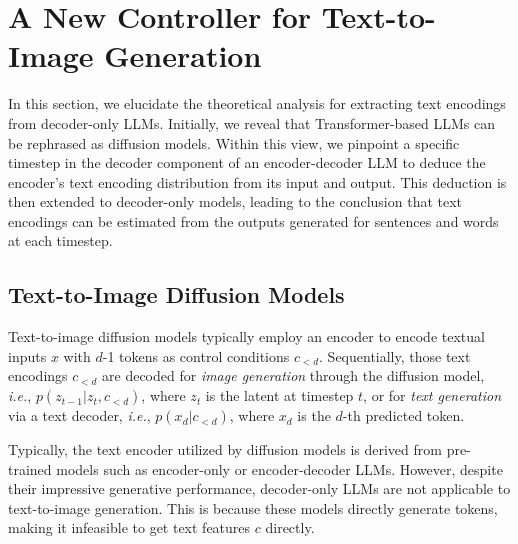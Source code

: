 \section{A New Controller for Text-to-Image Generation}
\label{sec:llm_diffusion}

In this section, we elucidate the theoretical analysis for extracting text encodings from decoder-only LLMs. Initially, we reveal that Transformer-based LLMs can be rephrased as diffusion models.
Within this view, we pinpoint a specific timestep in the decoder component of an encoder-decoder LLM to deduce the encoder's text encoding distribution from its input and output. This deduction is then extended to decoder-only models, leading to the conclusion that text encodings can be estimated from the outputs generated for sentences and words at each timestep.


\subsection{Text-to-Image Diffusion Models}
Text-to-image diffusion models typically employ an encoder to encode textual inputs $x$ with $d$-1 tokens as control conditions $c_{<d}$.
Sequentially, those text encodings $c_{<d}$ are decoded for \emph{image generation} through the diffusion model, \emph{i.e.}, $p(z_{t-1}|z_t, c_{<d})$, where $z_t$ is the latent at timestep $t$, or for \emph{text generation} via a text decoder, \emph{i.e.}, $p(x_d|c_{<d})$, where $x_d$ is the $d$-th predicted token. 


Typically, the text encoder utilized by diffusion models is derived from pre-trained models such as encoder-only or encoder-decoder LLMs. However, despite their impressive generative performance, decoder-only LLMs are not applicable to text-to-image generation. This is because these models directly generate tokens, making it infeasible to get text features $c$ directly.



